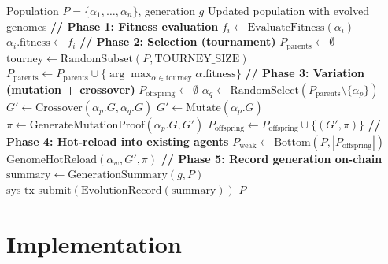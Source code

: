 \documentclass{article}
\begin{document}
\begin{algorithm}[t]
\caption{Population Evolution Cycle (Kernel-Managed)}
\label{alg:evolution}
\begin{algorithmic}[1]
\REQUIRE Population $P = \{\alpha_1, \ldots, \alpha_n\}$, generation $g$
\ENSURE Updated population with evolved genomes
\STATE \textbf{// Phase 1: Fitness evaluation}
    \STATE $f_i \leftarrow \text{EvaluateFitness}(\alpha_i)$ 
    \STATE $\alpha_i.\text{fitness} \leftarrow f_i$
\ENDFOR
\STATE \textbf{// Phase 2: Selection (tournament)}
\STATE $P_{\text{parents}} \leftarrow \emptyset$
    \STATE $\text{tourney} \leftarrow \text{RandomSubset}(P, \text{TOURNEY\_SIZE})$
    \STATE $P_{\text{parents}} \leftarrow P_{\text{parents}} \cup \{\arg\max_{\alpha \in \text{tourney}} \alpha.\text{fitness}\}$
\ENDFOR
\STATE \textbf{// Phase 3: Variation (mutation + crossover)}
\STATE $P_{\text{offspring}} \leftarrow \emptyset$
        \STATE $\alpha_q \leftarrow \text{RandomSelect}(P_{\text{parents}} \setminus \{\alpha_p\})$
        \STATE $G' \leftarrow \text{Crossover}(\alpha_p.G, \alpha_q.G)$
    \ELSE
        \STATE $G' \leftarrow \text{Mutate}(\alpha_p.G)$ 
    \ENDIF
    \STATE $\pi \leftarrow \text{GenerateMutationProof}(\alpha_p.G, G')$
    \STATE $P_{\text{offspring}} \leftarrow P_{\text{offspring}} \cup \{(G', \pi)\}$
\ENDFOR
\STATE \textbf{// Phase 4: Hot-reload into existing agents}
\STATE $P_{\text{weak}} \leftarrow \text{Bottom}(P, |P_{\text{offspring}}|)$ 
    \STATE $\text{GenomeHotReload}(\alpha_w, G', \pi)$ 
\ENDFOR
\STATE \textbf{// Phase 5: Record generation on-chain}
\STATE $\text{summary} \leftarrow \text{GenerationSummary}(g, P)$
\STATE $\text{sys\_tx\_submit}(\text{EvolutionRecord}(\text{summary}))$
\RETURN $P$
\end{algorithmic}
\end{algorithm}

%
%

\section{Implementation}
\label{sec:implementation}
\end{document}
